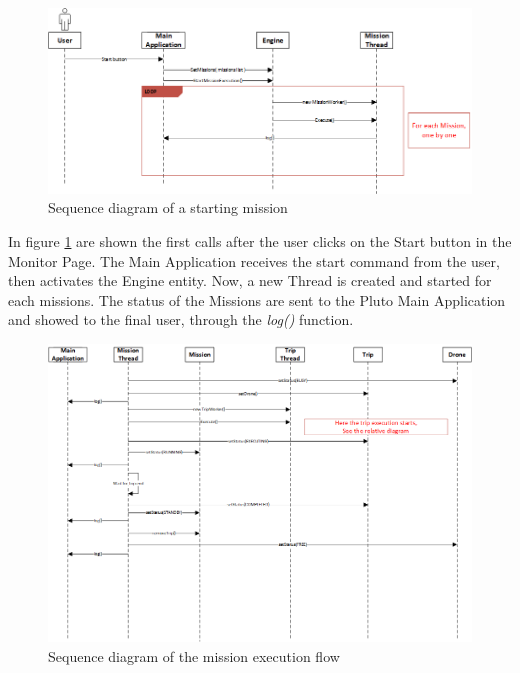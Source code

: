 \begin{figure}[H]
  \centering
  \includegraphics[width=\linewidth]{pictures/Alfalfa_Sequence_MissionStart.png}
  \caption{Sequence diagram of a starting mission}
  \label{fig:alfalfaSequence1}
\end{figure}

In figure \ref{fig:alfalfaSequence1} are shown the first calls after the user clicks on the Start button in the Monitor Page.
The Main Application receives the start command from the user, then activates the Engine entity. Now, a new Thread is created and started for each missions. The status of the Missions are sent to the Pluto Main Application and showed to the final user, through the \textit{log()} function.
\\

\begin{figure}[H]
  \centering
  \includegraphics[width=\linewidth]{pictures/Alfalfa_Sequence_MissionExecution.png}
  \caption{Sequence diagram of the mission execution flow}
  \label{fig:alfalfaSequence2}
\end{figure}

